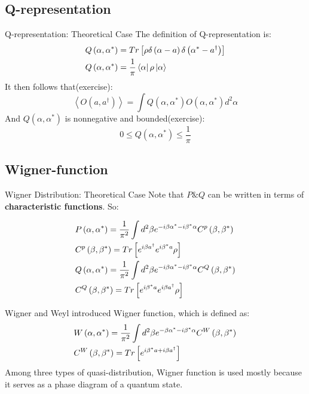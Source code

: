 \documentclass{beamer}
\begin{document}
\subsection{Q-representation}
\begin{frame}{Q-representation: Theoretical Case}
The definition of Q-representation is:
\[\begin{gathered}
Q\left( {\alpha ,{\alpha ^*}} \right) = Tr\left[ {\rho \delta \left( {\alpha  - a} \right)\delta \left( {{\alpha ^*} - {a^\dag }} \right)} \right] \hfill \\
Q\left( {\alpha ,{\alpha ^*}} \right) = \frac{1}{\pi }\left\langle \alpha  \right|\rho \left| \alpha  \right\rangle  \hfill \\ 
\end{gathered} \]
It then follows that(exercise):
\[\left\langle {O\left( {a,{a^\dag }} \right)} \right\rangle  = \int {Q\left( {\alpha ,{\alpha ^*}} \right)O\left( {\alpha ,{\alpha ^*}} \right)} {d^2}\alpha \]
And $Q\left( {\alpha ,{\alpha ^*}}\right)$ is nonnegative and bounded(exercise):
\[0 \leqslant Q\left( {\alpha ,{\alpha ^*}} \right) \leqslant \frac{1}{\pi }\]
\end{frame}
\subsection{Wigner-function}
\begin{frame}{Wigner Distribution: Theoretical Case}
Note that $P\&Q$ can be written in terms of \textbf{characteristic functions}. So:

\[\begin{gathered}
P\left( {\alpha ,{\alpha ^*}} \right) = \frac{1}{{{\pi ^2}}}\int {{d^2}\beta {e^{ - i\beta {\alpha ^*} - i{\beta ^*}\alpha }}{C^p}\left( {\beta ,{\beta ^*}} \right)}  \hfill \\
{C^p}\left( {\beta ,{\beta ^*}} \right) = Tr\left[ {{e^{i\beta {a^\dag }}}{e^{i{\beta ^*}a}}\rho } \right] \hfill \\
Q\left( {\alpha ,{\alpha ^*}} \right) = \frac{1}{{{\pi ^2}}}\int {{d^2}\beta {e^{ - i\beta {\alpha ^*} - i{\beta ^*}\alpha }}{C^Q}\left( {\beta ,{\beta ^*}} \right)}  \hfill \\
{C^Q}\left( {\beta ,{\beta ^*}} \right) = Tr\left[ {{e^{i{\beta ^*}a}}{e^{i\beta {a^\dag }}}\rho } \right] \hfill \\ 
\end{gathered} \]

Wigner and Weyl introduced Wigner function, which is defined as:
\[\begin{gathered}
W\left( {\alpha ,{\alpha ^*}} \right) = \frac{1}{{{\pi ^2}}}\int {{d^2}\beta {e^{ - \beta {\alpha ^*} - i{\beta ^*}\alpha }}{C^W}\left( {\beta ,{\beta ^*}} \right)}  \hfill \\
{C^W}\left( {\beta ,{\beta ^*}} \right) = Tr\left[ {{e^{i{\beta ^*}a + i\beta {a^\dag }}}} \right] \hfill \\ 
\end{gathered} \]
Among three types of quasi-distribution, Wigner function is used mostly because it serves as a phase diagram of a quantum state.
\end{frame}
\end{document}
